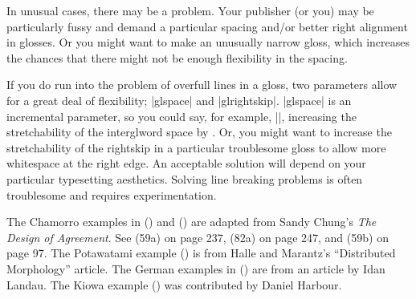 In unusual cases, there may be a problem.  Your publisher (or
you) may be particularly fussy and demand a particular spacing
and/or better right alignment in glosses.  Or you might want to make
an unusually narrow gloss, which increases the chances that there
might not be enough flexibility in the spacing.

If you do run into the problem of overfull lines in a gloss, two
parameters allow for a great deal of flexibility; |glspace| and
|glrightskip|. |glspace| is an incremental parameter, so you could say,
for example, ||, increasing the
stretchability of the interglword space by \textdim{.2 em}. Or,
you might want to increase the stretchability of the rightskip
in a particular troublesome gloss to allow more whitespace at the
right edge.  An acceptable solution will depend on your
particular typesetting aesthetics. Solving line breaking problems
is often troublesome and requires experimentation.

\medskip
The Chamorro examples in () and ()
are adapted from Sandy Chung's {\it The Design of Agreement}. See
(59a) on page 237, (82a) on page 247, and (59b) on page 97.  The
Potawatami example () is from Halle and Marantz's
``Distributed Morphology'' article. The German examples in
() are from an article by Idan Landau. The Kiowa
example () was contributed by Daniel Harbour.

